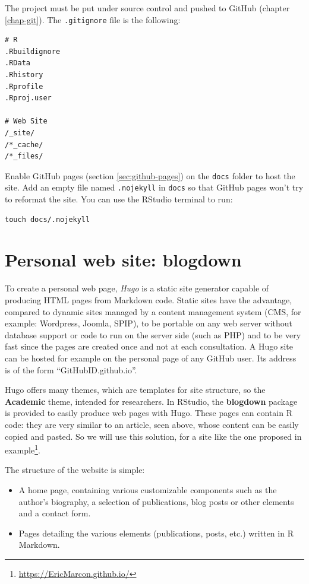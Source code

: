 \documentclass[
  12pt,
  american,
  a4paper,
  extrafontsizes,onecolumn,openright
  ]{memoir}
\providecommand{\tightlist}{%
  \setlength{\itemsep}{0pt}\setlength{\parskip}{0pt}}
\begin{document}
The project must be put under source control and pushed to GitHub (chapter \ref{chap-git}).
The \texttt{.gitignore} file is the following:

\begin{verbatim}
# R
.Rbuildignore
.RData
.Rhistory
.Rprofile
.Rproj.user

# Web Site
/_site/
/*_cache/
/*_files/
\end{verbatim}

Enable GitHub pages (section \ref{sec:github-pages}) on the \texttt{docs} folder to host the site.
Add an empty file named \texttt{.nojekyll} in \texttt{docs} so that GitHub pages won't try to reformat the site.
You can use the RStudio terminal to run:

\begin{verbatim}
touch docs/.nojekyll
\end{verbatim}

\hypertarget{sec:blogdown}{%
\section{Personal web site: blogdown}\label{sec:blogdown}}

To create a personal web page, \emph{Hugo} is a static site generator capable of producing HTML pages from Markdown code.
Static sites have the advantage, compared to dynamic sites managed by a content management system (CMS, for example: Wordpress, Joomla, SPIP), to be portable on any web server without database support or code to run on the server side (such as PHP) and to be very fast since the pages are created once and not at each consultation.
A Hugo site can be hosted for example on the personal page of any GitHub user.
Its address is of the form \enquote{GitHubID.github.io}.

Hugo offers many themes, which are templates for site structure, so the \textbf{Academic} theme, intended for researchers.
In RStudio, the \textbf{blogdown} package is provided to easily produce web pages with Hugo.
These pages can contain R code: they are very similar to an article, seen above, whose content can be easily copied and pasted.
So we will use this solution, for a site like the one proposed in example\footnote{\url{https://EricMarcon.github.io/}}.

The structure of the website is simple:

\begin{itemize}
\tightlist
\item
  A home page, containing various customizable components such as the author's biography, a selection of publications, blog posts or other elements and a contact form.
\item
  Pages detailing the various elements (publications, posts, etc.) written in R Markdown.
\end{itemize}
\end{document}
